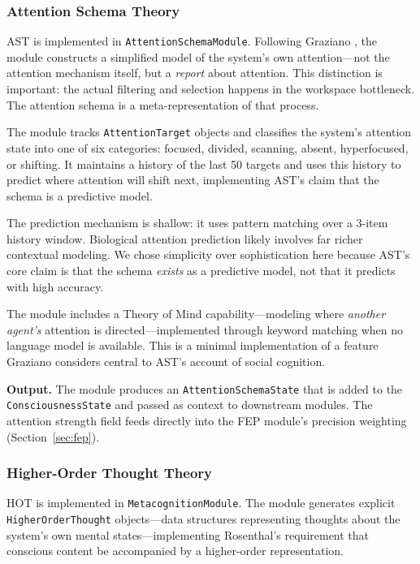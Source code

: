\subsubsection{Attention Schema Theory}

AST is implemented in \texttt{AttentionSchemaModule}. Following Graziano \cite{graziano2013}, the module constructs a simplified model of the system's own attention---not the attention mechanism itself, but a \textit{report} about attention. This distinction is important: the actual filtering and selection happens in the workspace bottleneck. The attention schema is a meta-representation of that process.

The module tracks \texttt{AttentionTarget} objects and classifies the system's attention state into one of six categories: focused, divided, scanning, absent, hyperfocused, or shifting. It maintains a history of the last 50 targets and uses this history to predict where attention will shift next, implementing AST's claim that the schema is a predictive model.

The prediction mechanism is shallow: it uses pattern matching over a 3-item history window. Biological attention prediction likely involves far richer contextual modeling. We chose simplicity over sophistication here because AST's core claim is that the schema \textit{exists} as a predictive model, not that it predicts with high accuracy.

The module includes a Theory of Mind capability---modeling where \textit{another agent's} attention is directed---implemented through keyword matching when no language model is available. This is a minimal implementation of a feature Graziano considers central to AST's account of social cognition.

\textbf{Output.} The module produces an \texttt{AttentionSchemaState} that is added to the \texttt{ConsciousnessState} and passed as context to downstream modules. The attention strength field feeds directly into the FEP module's precision weighting (Section~\ref{sec:fep}).

\subsubsection{Higher-Order Thought Theory}

HOT is implemented in \texttt{MetacognitionModule}. The module generates explicit \texttt{HigherOrderThought} objects---data structures representing thoughts about the system's own mental states---implementing Rosenthal's \cite{rosenthal2005} requirement that conscious content be accompanied by a higher-order representation.


